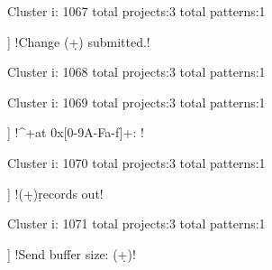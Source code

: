 Cluster i: 1067
total projects:3
total patterns:1
\begin{multicols}{1}
\begin{description}[noitemsep,topsep=0pt]
\item [[3] ] \cverb!Change (\d+) submitted.!
\end{description}
\end{multicols}







Cluster i: 1068
total projects:3
total patterns:1
\begin{multicols}{1}
\begin{description}[noitemsep,topsep=0pt]
\item [[3] ] \cverb!^\s*([A-Z_]+) = (\d+)$!
\end{description}
\end{multicols}







Cluster i: 1069
total projects:3
total patterns:1
\begin{multicols}{1}
\begin{description}[noitemsep,topsep=0pt]
\item [[3] ] \cverb!^\s+at 0x[0-9A-Fa-f]+: !
\end{description}
\end{multicols}







Cluster i: 1070
total projects:3
total patterns:1
\begin{multicols}{1}
\begin{description}[noitemsep,topsep=0pt]
\item [[3] ] \cverb!(\d+)\+\d records out!
\end{description}
\end{multicols}







Cluster i: 1071
total projects:3
total patterns:1
\begin{multicols}{1}
\begin{description}[noitemsep,topsep=0pt]
\item [[3] ] \cverb!Send buffer size: (\d+)!
\end{description}
\end{multicols}







